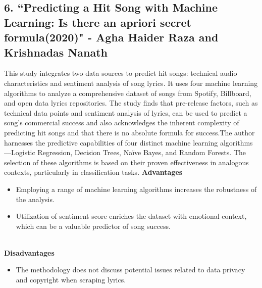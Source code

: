 \documentclass[11pt]{report}
\begin{document}
\subsection*{6. ``Predicting a Hit Song with Machine Learning: Is there an apriori secret formula(2020)" - Agha Haider Raza and Krishnadas Nanath\cite{reference6}}
This study integrates two data sources to predict hit songs: technical audio characteristics and sentiment analysis of song lyrics. It uses four machine learning algorithms to analyze a comprehensive dataset of songs from Spotify, Billboard, and open data lyrics repositories. The study finds that pre-release factors, such as technical data points and sentiment analysis of lyrics, can be used to predict a song's commercial success and also acknowledges the inherent complexity of predicting hit songs and that there is no absolute formula for success.The author harnesses the predictive capabilities of four distinct machine learning algorithms—Logistic Regression, Decision Trees, Naïve Bayes, and Random Forests. The selection of these algorithms is based on their proven effectiveness in analogous contexts, particularly in classification tasks.
\clearpage
\textbf{Advantages}
    \begin{itemize}
        \item Employing a range of machine learning algorithms increases the robustness of the analysis.
        \item Utilization of sentiment score enriches the dataset with emotional context, which can be a valuable predictor of song success.
    \end{itemize}
\\    
    \textbf{Disadvantages}
    \begin{itemize}
        \item The methodology does not discuss potential issues related to data privacy and copyright when scraping lyrics.
    \end{itemize}\\\\
\end{document}

